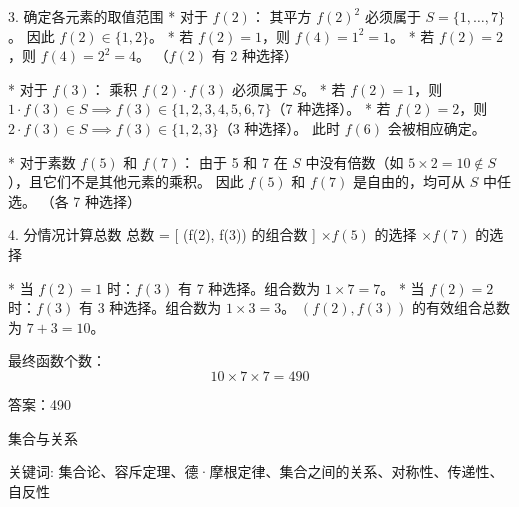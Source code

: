 \begin{questions}
\begin{solution}
3. 确定各元素的取值范围
* 对于 $f(2)$：
    其平方 $f(2)^2$ 必须属于 $S = \{1, \dots, 7\}$。
    因此 $f(2) \in \{1, 2\}$。
    * 若 $f(2) = 1$，则 $f(4) = 1^2 = 1$。
    * 若 $f(2) = 2$，则 $f(4) = 2^2 = 4$。
    （$f(2)$ 有 2 种选择）

* 对于 $f(3)$：
    乘积 $f(2) \cdot f(3)$ 必须属于 $S$。
    * 若 $f(2) = 1$，则 $1 \cdot f(3) \in S \implies f(3) \in \{1, 2, 3, 4, 5, 6, 7\}$（7 种选择）。
    * 若 $f(2) = 2$，则 $2 \cdot f(3) \in S \implies f(3) \in \{1, 2, 3\}$（3 种选择）。
    此时 $f(6)$ 会被相应确定。

* 对于素数 $f(5)$ 和 $f(7)$：
    由于 5 和 7 在 $S$ 中没有倍数（如 $5 \times 2 = 10 \notin S$），且它们不是其他元素的乘积。
    因此 $f(5)$ 和 $f(7)$ 是自由的，均可从 $S$ 中任选。
    （各 7 种选择）

4. 分情况计算总数
总数 = [ (f(2), f(3)) 的组合数 ] $\times f(5)$ 的选择 $\times f(7)$ 的选择

* 当 $f(2) = 1$ 时：$f(3)$ 有 7 种选择。组合数为 $1 \times 7 = 7$。
* 当 $f(2) = 2$ 时：$f(3)$ 有 3 种选择。组合数为 $1 \times 3 = 3$。
$(f(2), f(3))$ 的有效组合总数为 $7 + 3 = 10$。

最终函数个数：
\[ 10 \times 7 \times 7 = 490 \]

答案：490
\end{solution}
\end{questions}
\pagebreak

\begin{center}
  {\fontsize{30pt}{26pt}\selectfont
    \hypertarget{集合与关系}{集合与关系} \label{集合与关系}
  }
\end{center}
\separator
\begin{center}
    关键词: 集合论、容斥定理、德·摩根定律、集合之间的关系、对称性、传递性、自反性
\end{center}
\vspace{0.5pt}

